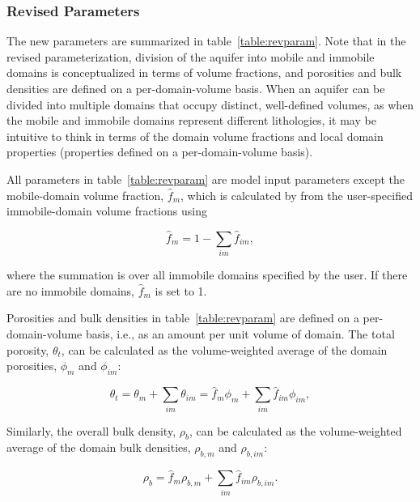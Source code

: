 \subsubsection{Revised Parameters}

The new parameters are summarized in table~\ref{table:revparam}. Note that in  the revised parameterization, division of the aquifer into mobile and immobile domains is conceptualized in terms of volume fractions, and porosities and bulk densities are defined on a per-domain-volume basis. When an aquifer can be divided into multiple domains that occupy distinct, well-defined volumes, as when the mobile and immobile domains represent different lithologies, it may be intuitive to think in terms of the domain volume fractions and local domain properties (properties defined on a per-domain-volume basis).



\noindent All parameters in table~\ref{table:revparam} are model input parameters except the mobile-domain volume fraction, $\hat{f}_m$, which is calculated by \mf from the user-specified immobile-domain volume fractions using

\begin{equation}
\label{eqn:fm5}
\hat{f}_m = 1 -  \sum_{im}{\hat{f}_{im}},
\end{equation}

\noindent where the summation is over all immobile domains specified by the user. If there are no immobile domains,  $\hat{f}_m$ is set to 1.

Porosities and bulk densities in table~\ref{table:revparam} are defined on a per-domain-volume basis, i.e., as an amount per unit volume of domain. The total porosity, $\theta_t$, can be calculated as the volume-weighted average of the domain porosities, $\phi_m$ and $\phi_{im}$:

\begin{equation}
\label{eqn:thetat}
\theta_{t} = \theta_{m} + \sum_{im}{\theta_{im}} = \hat{f}_{m} \phi_{m} + \sum_{im}{\hat{f}_{im} \phi_{im}} ,
\end{equation}

\noindent Similarly, the overall bulk density, $\rho_b$, can be calculated as the volume-weighted average of the domain bulk densities, $\rho_{b, m}$ and $\rho_{b, im}$:

\begin{equation}
\label{eqn:rhob2}
\rho_{b} = \hat{f}_m \rho_{b, m} + \sum_{im}{\hat{f}_{im} \rho_{b, im}}.
\end{equation}

